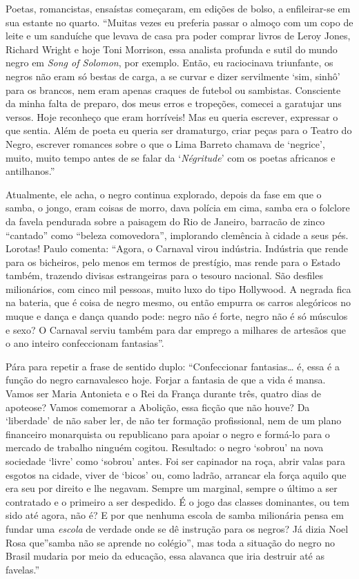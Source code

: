 \documentclass[
  letterpaper,
  DIV=11,
  numbers=noendperiod]{scrreprt}
\begin{document}
Poetas, romancistas, ensaístas começaram, em edições de bolso, a
enfileirar-se em sua estante no quarto. ``Muitas vezes eu preferia
passar o almoço com um copo de leite e um sanduíche que levava de casa
pra poder comprar livros de Leroy Jones, Richard Wright e hoje Toni
Morrison, essa analista profunda e sutil do mundo negro em \emph{Song of
Solomon}, por exemplo. Então, eu raciocinava triunfante, os negros não
eram só bestas de carga, a se curvar e dizer servilmente `sim, sinhô'
para os brancos, nem eram apenas craques de futebol ou sambistas.
Consciente da minha falta de preparo, dos meus erros e tropeções,
comecei a garatujar uns versos. Hoje reconheço que eram horríveis! Mas
eu queria escrever, expressar o que sentia. Além de poeta eu queria ser
dramaturgo, criar peças para o Teatro do Negro, escrever romances sobre
o que o Lima Barreto chamava de `negrice', muito, muito tempo antes de
se falar da `\emph{Négritude}' com os poetas africanos e antilhanos.''

Atualmente, ele acha, o negro continua explorado, depois da fase em que
o samba, o jongo, eram coisas de morro, dava polícia em cima, samba era
o folclore da favela pendurada sobre a paisagem do Rio de Janeiro,
barracão de zinco ``cantado'' como ``beleza comovedora'', implorando
clemência à cidade a seus pés. Lorotas! Paulo comenta: ``Agora, o
Carnaval virou indústria. Indústria que rende para os bicheiros, pelo
menos em termos de prestígio, mas rende para o Estado também, trazendo
divisas estrangeiras para o tesouro nacional. São desfiles milionários,
com cinco mil pessoas, muito luxo do tipo Hollywood. A negrada fica na
bateria, que é coisa de negro mesmo, ou então empurra os carros
alegóricos no muque e dança e dança quando pode: negro não é forte,
negro não é só músculos e sexo? O Carnaval serviu também para dar
emprego a milhares de artesãos que o ano inteiro confeccionam
fantasias''.

Pára para repetir a frase de sentido duplo: ``Confeccionar
fantasias\ldots{} é, essa é a função do negro carnavalesco hoje. Forjar
a fantasia de que a vida é mansa. Vamos ser Maria Antonieta e o Rei da
França durante três, quatro dias de apoteose? Vamos comemorar a
Abolição, essa ficção que não houve? Da `liberdade' de não saber ler, de
não ter formação profissional, nem de um plano financeiro monarquista ou
republicano para apoiar o negro e formá-lo para o mercado de trabalho
ninguém cogitou. Resultado: o negro `sobrou' na nova sociedade `livre'
como `sobrou' antes. Foi ser capinador na roça, abrir valas para esgotos
na cidade, viver de `bicos' ou, como ladrão, arrancar ela força aquilo
que era seu por direito e lhe negavam. Sempre um marginal, sempre o
último a ser contratado e o primeiro a ser despedido. É o jogo das
classes dominantes, ou tem sido até agora, não é? E por que nenhuma
escola de samba milionária pensa em fundar uma \emph{escola} de verdade
onde se dê instrução para os negros? Já dizia Noel Rosa que''samba não
se aprende no colégio'', mas toda a situação do negro no Brasil mudaria
por meio da educação, essa alavanca que iria destruir até as favelas.''
\end{document}
